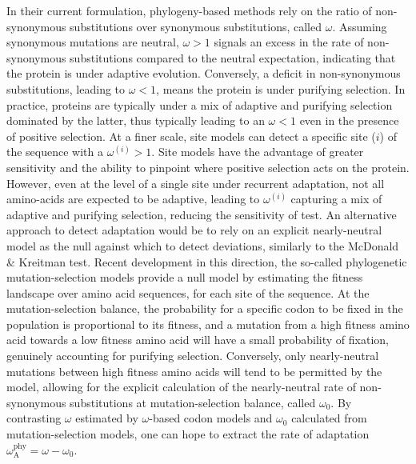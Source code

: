 \documentclass{article}
\newcommand{\rateApop}{\omega_{\mathrm{A}}}
\newcommand{\rateAphy}{\rateApop^{\mathrm{phy}}}
\begin{document}
    In their current formulation, phylogeny-based methods rely on the ratio of non-synonymous substitutions over synonymous substitutions, called $\omega$\cite{muse_likelihood_1994,goldman_codonbased_1994}.
    Assuming synonymous mutations are neutral, $\omega>1$ signals an excess in the rate of non-synonymous substitutions compared to the neutral expectation, indicating that the protein is under adaptive evolution.
    Conversely, a deficit in non-synonymous substitutions, leading to $\omega<1$, means the protein is under purifying selection.
    In practice, proteins are typically under a mix of adaptive and purifying selection dominated by the latter, thus typically leading to an $\omega<1$ even in the presence of positive selection.
    At a finer scale, site models can detect a specific site ($i$) of the sequence with a $\omega^{(i)}>1$\cite{yang_codonsubstitution_2000, kosiol_patterns_2008}.
    Site models have the advantage of greater sensitivity and the ability to pinpoint where positive selection acts on the protein.
    However, even at the level of a single site under recurrent adaptation, not all amino-acids are expected to be adaptive, leading to $\omega^{(i)}$ capturing a mix of adaptive and purifying selection, reducing the sensitivity of test.
    An alternative approach to detect adaptation would be to rely on an explicit nearly-neutral model as the null against which to detect deviations, similarly to the McDonald \& Kreitman test.
    Recent development in this direction, the so-called phylogenetic mutation-selection models provide a null model by estimating the fitness landscape over amino acid sequences, for each site of the sequence\cite{yang_mutationselection_2008, halpern_evolutionary_1998, rodrigue_mechanistic_2010}.
    At the mutation-selection balance, the probability for a specific codon to be fixed in the population is proportional to its fitness, and a mutation from a high fitness amino acid towards a low fitness amino acid will have a small probability of fixation, genuinely accounting for purifying selection.
    Conversely, only nearly-neutral mutations between high fitness amino acids will tend to be permitted by the model, allowing for the explicit calculation of the nearly-neutral rate of non-synonymous substitutions at mutation-selection balance, called $\omega_{0}$\cite{spielman_relationship_2015, rodrigue_detecting_2017}.
    By contrasting $\omega$ estimated by $\omega$-based codon models and $\omega_{0}$ calculated from mutation-selection models, one can hope to extract the rate of adaptation $\rateAphy = \omega - \omega_{0}$.
\end{document}
